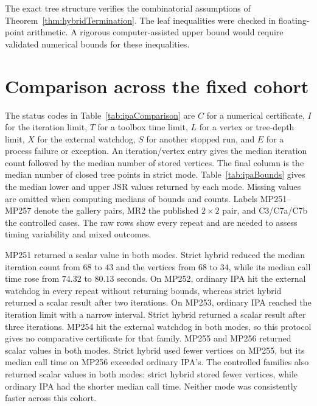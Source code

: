 The exact tree structure verifies the combinatorial assumptions of Theorem~\ref{thm:hybridTermination}.
The leaf inequalities were checked in floating-point arithmetic.
A rigorous computer-assisted upper bound would require validated numerical bounds for these inequalities.

\section{Comparison across the fixed cohort}
\label{sec:numericsCohort}
The status codes in Table~\ref{tab:ipaComparison} are $C$ for a numerical certificate, $I$ for the iteration limit, $T$ for a toolbox time limit, $L$ for a vertex or tree-depth limit, $X$ for the external watchdog, $S$ for another stopped run, and $E$ for a process failure or exception.
An iteration/vertex entry gives the median iteration count followed by the median number of stored vertices.
The final column is the median number of closed tree points in strict mode.
Table~\ref{tab:ipaBounds} gives the median lower and upper JSR values returned by each mode.
Missing values are omitted when computing medians of bounds and counts.
Labels MP251--MP257 denote the gallery pairs, MR2 the published $2\times2$ pair, and C3/C7a/C7b the controlled cases.
The raw rows show every repeat and are needed to assess timing variability and mixed outcomes.



MP251 returned a scalar value in both modes.
Strict hybrid reduced the median iteration count from $68$ to $43$ and the vertices from $68$ to $34$, while its median call time rose from $74.32$ to $80.13$ seconds.
On MP252, ordinary IPA hit the external watchdog in every repeat without returning bounds, whereas strict hybrid returned a scalar result after two iterations.
On MP253, ordinary IPA reached the iteration limit with a narrow interval.
Strict hybrid returned a scalar result after three iterations.
MP254 hit the external watchdog in both modes, so this protocol gives no comparative certificate for that family.
MP255 and MP256 returned scalar values in both modes.
Strict hybrid used fewer vertices on MP255, but its median call time on MP256 exceeded ordinary IPA's.
The controlled families also returned scalar values in both modes: strict hybrid stored fewer vertices, while ordinary IPA had the shorter median call time.
Neither mode was consistently faster across this cohort.

